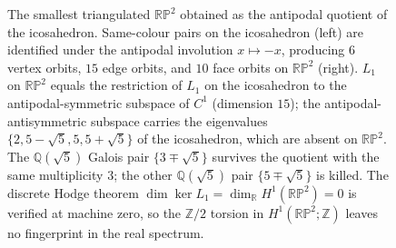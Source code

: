 \documentclass[12pt,a4paper]{article}
\theoremstyle{definition}
\theoremstyle{remark}
\newcommand{\bZ}{\mathbb{Z}}
\newcommand{\bR}{\mathbb{R}}
\newcommand{\bQ}{\mathbb{Q}}                %
\DeclareMathOperator{\Spec}{Spec}
\begin{document}
\begin{figure}[H]
\caption{The smallest triangulated $\mathbb{RP}^2$ obtained as the
antipodal quotient of the icosahedron. Same-colour pairs on the
icosahedron (left) are identified under the antipodal involution
$x \mapsto -x$, producing $6$ vertex orbits, $15$ edge orbits, and
$10$ face orbits on $\mathbb{RP}^2$ (right). $L_1$ on $\mathbb{RP}^2$
equals the restriction of $L_1$ on the icosahedron to the
antipodal-symmetric subspace of $C^1$ (dimension $15$); the
antipodal-antisymmetric subspace carries the eigenvalues
$\{2, 5{-}\sqrt 5, 5, 5{+}\sqrt 5\}$ of the icosahedron, which are
absent on $\mathbb{RP}^2$. The $\bQ(\sqrt 5)$ Galois pair
$\{3 \mp \sqrt 5\}$ survives the quotient with the same multiplicity
$3$; the other $\bQ(\sqrt 5)$ pair $\{5 \mp \sqrt 5\}$ is killed. The
discrete Hodge theorem $\dim \ker L_1 = \dim_\bR H^1(\mathbb{RP}^2) = 0$
is verified at machine zero, so the $\bZ/2$ torsion in
$H^1(\mathbb{RP}^2; \bZ)$ leaves no fingerprint in the real spectrum.}
\label{fig:rp2-quotient}
\end{figure}
\end{document}
